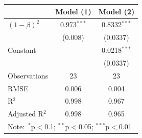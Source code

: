 \documentclass[]{amsart}
\begin{document}
\begin{table}[htb]
\begin{center}
\begin{tabular}{lcc}
					& Model (1) & Model (2)  \\ 
					\hline 
					{$(1-\beta)^2$} & \multicolumn{1}{c}{0.973$^{***}$} & \multicolumn{1}{c}{0.8332$^{***}$}   \\ 
					
					
					& (0.008)& (0.0337)  \\ 
					
					{Constant} &  & \multicolumn{1}{c}{0.0218$^{***}$}   \\ 
					
					& & \multicolumn{1}{c}{(0.0337)} \\ 
					
					\hline 
					
					Observations & \multicolumn{1}{c}{23} & \multicolumn{1}{c}{23} \\ 
					
					RMSE & \multicolumn{1}{c}{0.006} & \multicolumn{1}{c}{0.004}  \\ 
					
					R$^{2}$ & \multicolumn{1}{c}{0.998} & \multicolumn{1}{c}{0.967} \\ 
					
					Adjusted R$^{2}$ & \multicolumn{1}{c}{0.998} & \multicolumn{1}{c}{0.965}  \\ 
					\bottomrule
					\multicolumn{3}{l}{Note:\ $^{*}$p$<$0.1; $^{**}$p$<$0.05; $^{***}$p$<$0.01 \endgraf}
				\end{tabular}
			\end{center}
			

		\end{table}


\end{document}
